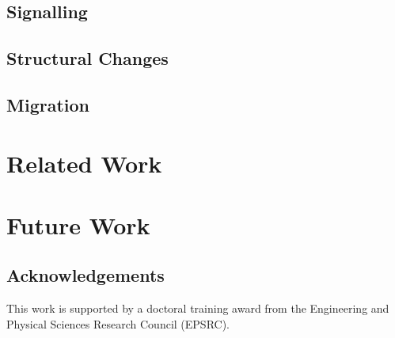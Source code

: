\documentclass{acm_proc_article-sp}
\begin{document}
\subsection{Signalling}
\label{signalling}

\subsection{Structural Changes}
\label{structchange}

\subsection{Migration}
\label{migration}

\section{Related Work}

\section{Future Work}

\subsection*{Acknowledgements}

This work is supported by a doctoral training award from the Engineering
and Physical Sciences Research Council ({EPSRC}).



\end{document}

